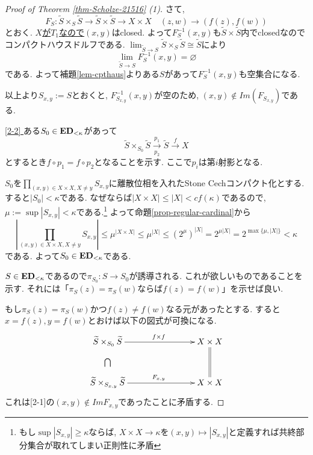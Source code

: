 \documentclass[dvipdfmx,a4paper,11pt]{article}
\theoremstyle{definition}
\begin{document}
\begin{proof}[Proof of Theorem \ref{thm-Scholze-21516} (1)]
さて, 
$$
F_S : \widetilde{S} \times_{S} \widetilde{S} \to \widetilde{S} \times  \widetilde{S} \to X \times X
\quad (z,w) \to (f(z), f(w))
$$
とおく. \underline{$X$が$T_1$なので}$(x,y)$はclosed. 
よって$F_{S}^{-1}(x,y)$も$\widetilde{S} \times \widetilde{S}$内でclosedなのでコンパクトハウスドルフである.
$\lim_{\widetilde{S} \to S} \widetilde{S} \times_{S} \widetilde{S} \cong \widetilde{S}$により
$$\lim_{\widetilde{S} \to S}F_{S}^{-1}(x,y)  
= \varnothing
$$
である. よって補題\ref{lem-cpthaus}よりある$S$があって$F_{S}^{-1}(x,y) $も空集合になる.

以上より$S_{x,y}:=S$とおくと, $F_{S_{x,y}}^{-1}(x,y) $が空のため, $(x,y) \not \in Im(F_{S_{x,y}})$である.

\underline{[2-2] } 
ある$S_0 \in {\bf ED}_{<\kappa}$があって
$$
\widetilde{S} \times_{S_0} \widetilde{S}
\underset{p_2}{\overset{p_1}{\to}}
\widetilde{S}
\overset{f}{\to} X
$$
とするとき$f \circ p_1 = f \circ p_2$となることを示す. 
ここで$p_i$は第$i$射影となる.

$S_0$を$\prod_{(x, y) \in X \times X, X \neq y}S_{x,y}$に離散位相を入れたStone Cechコンパクト化とする.
すると$|S_0| < \kappa$である. 
なぜならば$|X \times X| \le |X| < cf(\kappa)$であるので, 
$\mu:=\sup|S_{x,y}| < \kappa$である.\footnote{もし$\sup|S_{x,y}| \ge  \kappa $ならば, $X \times X \to \kappa$を$(x,y) \mapsto |S_{x,y}|$と定義すれば共終部分集合が取れてしまい正則性に矛盾}
よって命題\ref{prop-regular-cardinal}から
$$
|\prod_{(x, y) \in X \times X, X \neq y}S_{x,y}|
\le 
\mu^{|X \times X|}
\le 
\mu^{|X|}
\le (2^{\mu})^{|X|}
= 2^{\mu |X|}
= 2^{\max \{\mu, |X|\} }
< \kappa 
$$
である. 
よって$S_0 \in {\bf ED}_{< \kappa}$である.

$S \in {\bf ED}_{< \kappa}$であるので$\pi_{S_0} : S \to S_0$が誘導される. これが欲しいものであることを示す. 
それには「$\pi_{S}(z) =\pi_{S}(w)$ならば$f(z) =f(w)$」を示せば良い.

もし$\pi_{S}(z) =\pi_{S}(w)$かつ$f(z)  \neq f(w)$なる元があったとする. 
すると$x = f(z), y = f(w)$とおけば以下の図式が可換になる. 
\begin{equation*}
\xymatrix@C=80pt@R=30pt{
\widetilde{S} \times_{S_0} \widetilde{S}\ar@{->}[r]^{f \times f}
\ar@{}[d]|{\bigcap} 
&X \times X  \ar@{=}[d]
\\
\widetilde{S} \times_{S_{x,y}} \widetilde{S}\ar@{->}[r]^{F_{x,y}}
& X \times X
 \\   
}
\end{equation*}
これは[2-1]の$(x,y) \not \in Im F_{x,y}$であったことに矛盾する.


\end{proof}
\end{document}
